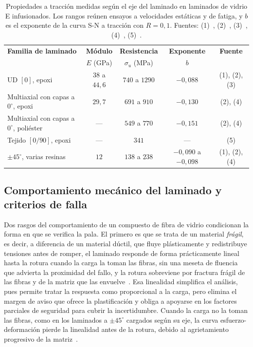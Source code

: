 \begin{table}[H]
    \centering
    \caption[Propiedades a tracción de laminados de vidrio E infusionados.]{Propiedades a tracción medidas según el eje del laminado en laminados de vidrio E infusionados. Los rangos reúnen ensayos a velocidades estáticas y de fatiga, y $b$ es el exponente de la curva S-N a tracción con $R = 0{,}1$. Fuentes: (1)~\textcite{Arwood2023}, (2)~\textcite{Samborsky2012}, (3)~\textcite{Xin2023}, (4)~\textcite{Samborsky2010}, (5)~\textcite{Moraras2026}.}
    \label{tab:laminados_infusionados}
    \renewcommand{\arraystretch}{1.2}
    \footnotesize
    \begin{tabular}{l c c c c}
        \hline
        \textbf{Familia de laminado} & \textbf{Módulo} & \textbf{Resistencia} & \textbf{Exponente} & \textbf{Fuente}\\
        & $E$ (GPa) & $\sigma_u$ (MPa) & $b$ & \\
        \hline
        UD $[0]$, epoxi & $38$ a $44{,}6$ & $740$ a $1290$ & $-0{,}088$ & (1), (2), (3)\\
        Multiaxial con capas a $0^\circ$, epoxi & $29{,}7$ & $691$ a $910$ & $-0{,}130$ & (2), (4)\\
        Multiaxial con capas a $0^\circ$, poliéster & --- & $549$ a $770$ & $-0{,}151$ & (2), (4)\\
        Tejido $[0/90]$, epoxi & --- & $341$ & --- & (5)\\
        $\pm 45^\circ$, varias resinas & $12$ & $138$ a $238$ & $-0{,}090$ a $-0{,}098$ & (1), (2), (4)\\
        \hline
    \end{tabular}
\end{table}

\subsection{Comportamiento mecánico del laminado y criterios de falla}
\label{sec:comportamiento_laminado}

Dos rasgos del comportamiento de un compuesto de fibra de vidrio condicionan la forma en que se verifica la pala. El primero es que se trata de un material \textit{frágil}, es decir, a diferencia de un material dúctil, que fluye plásticamente y redistribuye tensiones antes de romper, el laminado responde de forma prácticamente lineal hasta la rotura cuando la carga la toman las fibras, sin una meseta de fluencia que advierta la proximidad del fallo, y la rotura sobreviene por fractura frágil de las fibras y de la matriz que las envuelve~\parencite{Moraras2023}. Esa linealidad simplifica el análisis, pues permite tratar la respuesta como proporcional a la carga, pero elimina el margen de aviso que ofrece la plastificación y obliga a apoyarse en los factores parciales de seguridad para cubrir la incertidumbre. Cuando la carga no la toman las fibras, como en los laminados a $\pm 45^\circ$ cargados según su eje, la curva esfuerzo-deformación pierde la linealidad antes de la rotura, debido al agrietamiento progresivo de la matriz~\parencite{Samborsky2010}.


